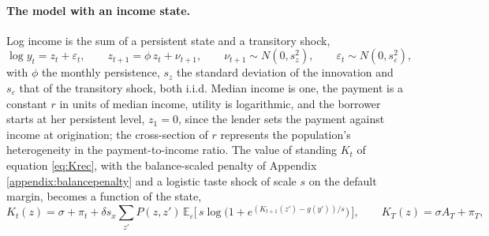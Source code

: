 \paragraph{The model with an income state.} Log income is the sum of a persistent state and a transitory shock,
\begin{equation}\label{eq:persistent_income}
\log y_t = z_t + \varepsilon_t, \qquad z_{t+1} = \phi\, z_t + \nu_{t+1}, \qquad \nu_{t+1} \sim N(0, s_z^2), \qquad \varepsilon_t \sim N(0, s_\varepsilon^2),
\end{equation}
with $\phi$ the monthly persistence, $s_z$ the standard deviation of the innovation and $s_\varepsilon$ that of the transitory shock, both i.i.d. Median income is one, the payment is a constant $r$ in units of median income, utility is logarithmic, and the borrower starts at her persistent level, $z_1 = 0$, since the lender sets the payment against income at origination; the cross-section of $r$ represents the population's heterogeneity in the payment-to-income ratio. The value of standing $K_t$ of equation \eqref{eq:Krec}, with the balance-scaled penalty of Appendix \ref{appendix:balancepenalty} and a logistic taste shock of scale $s$ on the default margin, becomes a function of the state,
\begin{equation}\label{eq:persistent_K}
K_t(z) = \sigma + \pi_t + \delta s_x \sum_{z'} P(z, z')\, \mathbb{E}_{\varepsilon}\Big[\, s \log\big(1 + e^{(K_{t+1}(z') - g(y'))/s}\big) \,\Big], \qquad K_T(z) = \sigma A_T + \pi_T,
\end{equation}
